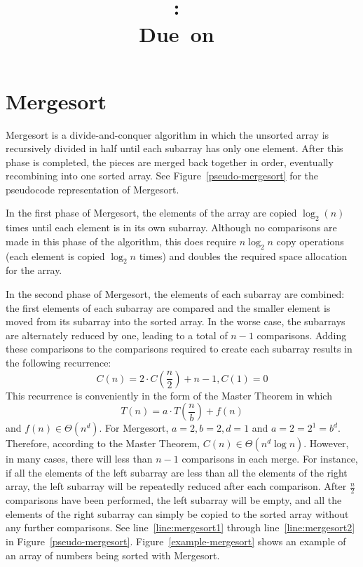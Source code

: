 \documentclass{article}
\title{
    \vspace{2in}
    \textmd{\textbf{\hmwkClass:\ \hmwkTitle}}\\
    \normalsize\vspace{0.1in}\small{Due\ on\ \hmwkDueDate}\\
    \vspace{0.1in}\large{\textit{\hmwkClassInstructor}}
    \vspace{3in}
}
\author{\textbf{\hmwkAuthorName}}
\date{}
\begin{document}
\pagebreak



\section{Mergesort}
Mergesort is a divide-and-conquer algorithm in which the unsorted array is recursively divided
in half until each subarray has only one element. After this phase is completed, the pieces are 
merged back together in order, eventually recombining into one sorted array. See 
Figure~\ref{pseudo-mergesort} for the pseudocode representation of Mergesort.

In the first phase of Mergesort, the elements of the array are copied $\log_2(n)$ times until each 
element is in its own subarray. Although no comparisons are made in this phase of the algorithm,
this does require $n\log_2 n$ copy operations (each element is copied $\log_2n$ times) 
and doubles the required space allocation for the array.

In the second phase of Mergesort, the elements of each subarray are combined: the first elements of each subarray are compared and the smaller element is moved from its subarray into the sorted array. In the worse case, the subarrays are alternately reduced by one, leading to a total of $n-1$
comparisons. Adding these comparisons to the comparisons required to create each subarray 
results in the following recurrence:
\[
	C(n) = 2 \cdot C\left(\frac{n}{2}\right) + n-1, C(1) = 0
\]
This recurrence is conveniently in the form of the Master Theorem in which
\[
	T(n) = a \cdot T\left(\frac{n}{b}\right) +f(n)
\]
and $f(n) \in \Theta(n^d)$. For Mergesort, $a = 2, b = 2, d = 1$ and $a = 2 = 2^1 = b^d$. 
Therefore, according to the Master Theorem, $C(n) \in \Theta(n^d \log n)$. However, in many
cases, there will less than $n-1$ comparisons in each merge. For instance, if
all the elements of the left subarray are less than all the elements of the right array, the left
subarray will be repeatedly reduced after each comparison. After $\frac{n}{2}$ comparisons 
have been performed, the left subarray will be empty, and all the elements of the right subarray 
can simply be copied to the sorted array without any further comparisons. 
See line~\ref{line:mergesort1} through line~\ref{line:mergesort2} in Figure~\ref{pseudo-mergesort}.
Figure~\ref{example-mergesort} shows an example of an array of numbers being sorted with Mergesort.
\end{document}
